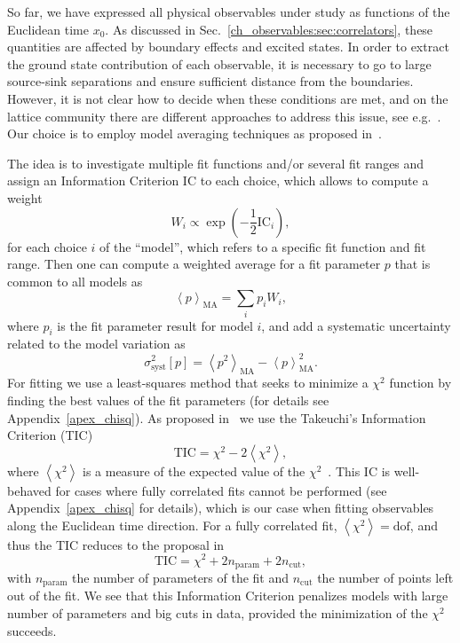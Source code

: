 So far, we have expressed all physical observables under study as functions of the Euclidean time $x_0$. As discussed in Sec.~\ref{ch_observables:sec:correlators}, these quantities are affected by boundary effects and excited states. In order to extract the ground state contribution of each observable, it is necessary to go to large source-sink separations and ensure sufficient distance from the boundaries. However, it is not clear how to decide when these conditions are met, and on the lattice community there are different approaches to address this issue, see e.g.~\citep{Strassberger:2023xnj,Bruno:2016plf,RQCD_scale}. Our choice is to employ model averaging techniques as proposed in~\citep{Neil:2022joj,Neil:2023pgt,Frison:2023jbv}.

The idea is to investigate multiple fit functions and/or several fit ranges and assign an Information Criterion ${\textrm{IC}}$ to each choice, which allows to compute a weight
\begin{equation}
\label{ch_observables:eq:weight}
W_i\propto\exp\left(-\frac{1}{2}{\textrm{IC}}_i\right),
\end{equation}
for each choice $i$ of the ``model'', which refers to a specific fit function and fit range. Then one can compute a weighted average for a fit parameter $p$ that is common to all models as
\begin{equation}
\left<{p}\right>_{\textrm{MA}}=\sum_i{p}_iW_i,
\end{equation}
where $p_i$ is the fit parameter result for model $i$, and add a systematic uncertainty related to the model variation as
\begin{equation}
\label{ch_observables:eq:syst}
\sigma_{\textrm{syst}}^2[p]=\left<{p^2}\right>_{\textrm{MA}}-\left<p\right>^2_{\textrm{MA}}.
\end{equation}
For fitting we use a least-squares method that seeks to minimize a $\chi^2$ function by finding the best values of the fit parameters (for details see Appendix~\ref{apex_chisq}). As proposed in~\citep{Frison:2023jbv} we use the Takeuchi's Information Criterion (TIC)
\begin{equation}
\label{ch_observables:eq:TIC}
{\textrm{TIC}}=\chi^2-2\left<\chi^2\right>,
\end{equation}
where $\left<\chi^2\right>$ is a measure of the expected value of the $\chi^2$~\citep{Bruno:2022mfy}. This IC is well-behaved for cases where fully correlated fits cannot be performed (see Appendix~\ref{apex_chisq} for details), which is our case when fitting observables along the Euclidean time direction. For a fully correlated fit, $\left<\chi^2\right>={\textrm{dof}}$, and thus the TIC reduces to the proposal in~\citep{Neil:2022joj}
\begin{equation}
{\textrm{TIC}}=\chi^2+2n_{\textrm{param}}+2n_{\textrm{cut}},
\end{equation}
with $n_{\textrm{param}}$ the number of parameters of the fit and $n_{\textrm{cut}}$ the number of points left out of the fit. We see that this Information Criterion penalizes models with large number of parameters and big cuts in data, provided the minimization of the $\chi^2$ succeeds.

